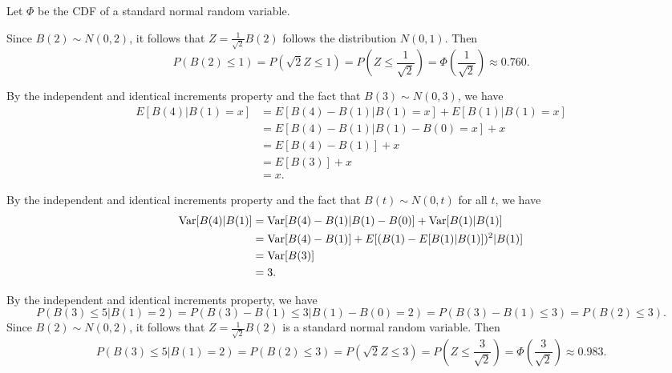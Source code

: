 \documentclass{homework}
\begin{document}
	
	\question Let $\Phi$ be the CDF of a standard normal random variable.
	\begin{alphaparts}
		\questionpart Since $B(2) \sim N(0,2)$, it follows that $Z = \frac{1}{\sqrt{2}}B(2)$ follows the distribution $N(0,1)$. Then
		\begin{equation*}
			P(B(2) \le 1) = P\left(\sqrt{2}{Z} \le 1\right) = P\left(Z \le \frac{1}{\sqrt{2}}\right) = \Phi\left(\frac{1}{\sqrt{2}}\right) \approx 0.760.
		\end{equation*}
		
		\questionpart By the independent and identical increments property and the fact that $B(3) \sim N(0,3)$, we have
		\begin{align*}
			E[B(4)|B(1) =x] &= E[B(4) - B(1)|B(1)=x] + E[B(1)|B(1)=x] \\
			&= E[B(4) - B(1)|B(1)-B(0)=x] + x \\
			&= E[B(4)-B(1)] + x\\
			&= E[B(3)] + x \\
			&= x.
		\end{align*}
		
		\questionpart By the independent and identical increments property and the fact that $B(t) \sim N(0,t)$ for all $t$, we have
		\begin{align*}
			\mathrm{Var}[B(4)|B(1)] &= \mathrm{Var}[B(4) - B(1)|B(1) - B(0)] + \mathrm{Var}[B(1)|B(1)] \\
			&= \mathrm{Var}[B(4) - B(1)] + E[(B(1) - E[B(1)|B(1)])^2|B(1)] \\
			&= \mathrm{Var}[B(3)] \\
			&= 3.
		\end{align*}
		
		\questionpart By the independent and identical increments property, we have
		\begin{equation*}
			P(B(3) \le 5 |B(1)=2) = P(B(3) - B(1) \le 3 | B(1) - B(0)=2) = P(B(3)- B(1)\le 3) = P(B(2) \le 3).
		\end{equation*}
		Since $B(2) \sim N(0,2)$, it follows that $Z = \frac{1}{\sqrt{2}}B(2)$ is a standard normal random variable. Then
		\begin{equation*}
			P(B(3)\le 5 |B(1)=2) = P(B(2) \le 3) = P(\sqrt{2}Z\le 3) = P\left(Z \le \frac{3}{\sqrt{2}}\right) = \Phi\left(\frac{3}{\sqrt{2}}\right) \approx 0.983.
		\end{equation*}
	\end{alphaparts}
	
\end{document}
